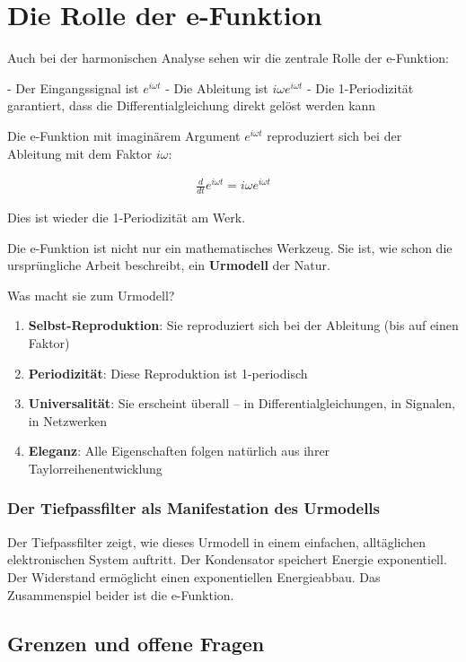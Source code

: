 \documentclass[a4paper, 12pt, twoside, openright]{report}
\theoremstyle{definition}
\theoremstyle{definition}
\begin{document}
\section{Die Rolle der e-Funktion}

Auch bei der harmonischen Analyse sehen wir die zentrale Rolle der e-Funktion:

- Der Eingangssignal ist $e^{i\omega t}$
- Die Ableitung ist $i\omega e^{i\omega t}$
- Die 1-Periodizität garantiert, dass die Differentialgleichung direkt gelöst werden kann

Die e-Funktion mit imaginärem Argument $e^{i\omega t}$ reproduziert sich bei der Ableitung mit dem Faktor $i\omega$:

\begin{align}
	\frac{d}{dt} e^{i\omega t} = i\omega e^{i\omega t}
\end{align}

Dies ist wieder die 1-Periodizität am Werk.

Die e-Funktion ist nicht nur ein mathematisches Werkzeug. Sie ist, wie schon die ursprüngliche Arbeit beschreibt, ein \textbf{Urmodell} der Natur.

Was macht sie zum Urmodell?

\begin{enumerate}
	\item \textbf{Selbst-Reproduktion}: Sie reproduziert sich bei der Ableitung (bis auf einen Faktor)
	\item \textbf{Periodizität}: Diese Reproduktion ist 1-periodisch
	\item \textbf{Universalität}: Sie erscheint überall -- in Differentialgleichungen, in Signalen, in Netzwerken
	\item \textbf{Eleganz}: Alle Eigenschaften folgen natürlich aus ihrer Taylorreihenentwicklung
\end{enumerate}

\subsubsection*{Der Tiefpassfilter als Manifestation des Urmodells}

Der Tiefpassfilter zeigt, wie dieses Urmodell in einem einfachen, alltäglichen elektronischen System auftritt. Der Kondensator speichert Energie exponentiell. Der Widerstand ermöglicht einen exponentiellen Energieabbau. Das Zusammenspiel beider ist die e-Funktion.

\subsection{Grenzen und offene Fragen}
\end{document}
